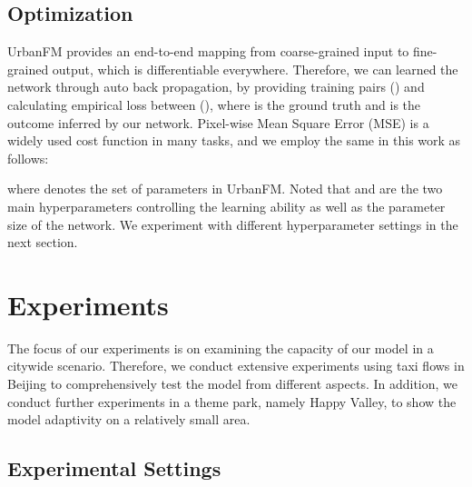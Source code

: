 \subsection{Optimization}
UrbanFM provides an end-to-end mapping from coarse-grained input to fine-grained output, which is differentiable everywhere. Therefore, we can learned the network through auto back propagation, by providing training pairs () and calculating empirical loss between (), where  is the ground truth and  is the outcome inferred by our network. Pixel-wise Mean Square Error (MSE) is a widely used cost function in many tasks, and we employ the same in this work as follows:

where  denotes the set of parameters in UrbanFM. Noted that  and  are the two main hyperparameters controlling the learning ability as well as the parameter size of the network. We experiment with different hyperparameter settings in the next section.



\section{Experiments}\label{sec:exp}
The focus of our experiments is on examining the capacity of our model in a citywide scenario. Therefore, we conduct extensive experiments using taxi flows in Beijing to comprehensively test the model from different aspects. In addition, we conduct further experiments in a theme park, namely Happy Valley, to show the model adaptivity on a relatively small area. 

\subsection{Experimental Settings}
